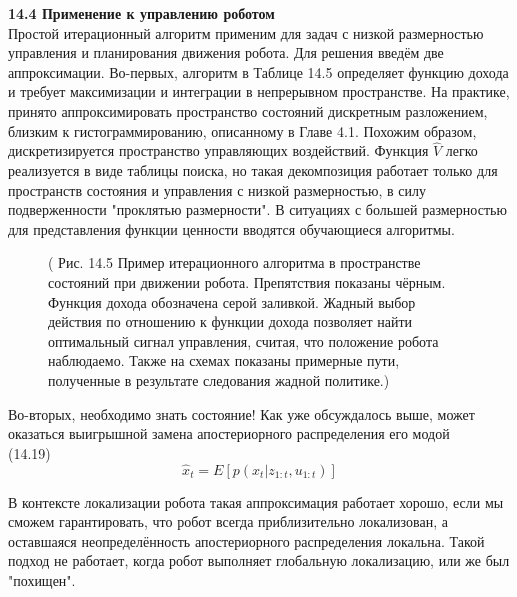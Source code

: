 \documentclass[10pt,a4paper]{article}
\begin{document}
\textbf{14.4	Применение к управлению роботом}\\

Простой итерационный алгоритм применим для задач с низкой размерностью управления и планирования движения робота. Для решения введём две аппроксимации.			
Во-первых, алгоритм в Таблице 14.5 определяет функцию дохода и требует максимизации и интеграции в непрерывном пространстве. На практике, принято аппроксимировать пространство состояний дискретным разложением, близким к гистограммированию, описанному в Главе 4.1. Похожим образом, дискретизируется пространство управляющих воздействий. Функция $\hat{V}$ легко реализуется в виде таблицы поиска, но такая декомпозиция работает только для пространств состояния и управления с низкой размерностью, в силу подверженности  "проклятью размерности". В ситуациях с большей размерностью для представления функции ценности вводятся обучающиеся алгоритмы.	
	
\begin{figure}[H]
	\caption{ ( Рис. 14.5 Пример итерационного алгоритма в пространстве состояний при движении робота. Препятствия показаны чёрным. Функция дохода обозначена серой заливкой. Жадный выбор действия по отношению к функции дохода позволяет найти оптимальный сигнал управления, считая, что положение робота наблюдаемо. Также на схемах показаны примерные пути, полученные в результате следования жадной политике.) }
	\label{fig:145orig}
\end{figure}	
	
Во-вторых, необходимо знать состояние! Как уже обсуждалось выше, может оказаться выигрышной замена апостериорного распределения его модой\\

(14.19)	
$$\hat{x}_t=E[p(x_t|z_{1:t},u_{1:t})]$$	
	
В контексте локализации робота такая аппроксимация работает хорошо, если мы сможем гарантировать, что робот всегда приблизительно локализован, а оставшаяся неопределённость апостериорного распределения локальна. Такой подход не работает, когда робот выполняет глобальную локализацию, или же был "похищен".	
	
\end{document}
